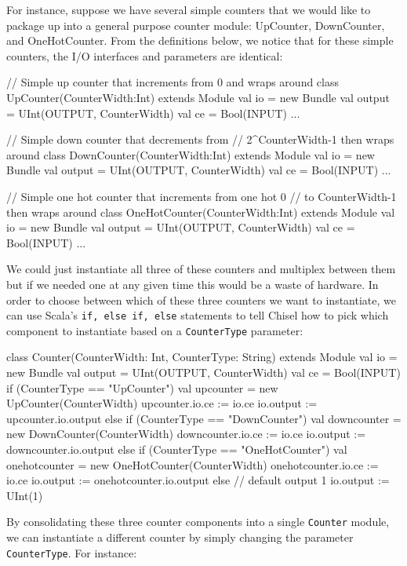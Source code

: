 For instance, suppose we have several simple counters that we would like to package up into a general purpose counter module: UpCounter, DownCounter, and OneHotCounter. From the definitions below, we notice that for these simple counters, the I/O interfaces and parameters are identical:

\begin{scala}
// Simple up counter that increments from 0 and wraps around
class UpCounter(CounterWidth:Int) extends Module {
  val io = new Bundle {
    val output = UInt(OUTPUT, CounterWidth)
    val ce     = Bool(INPUT)
  }...
}

// Simple down counter that decrements from 
// 2^CounterWidth-1 then wraps around
class DownCounter(CounterWidth:Int) extends Module{
  val io = new Bundle {
    val output = UInt(OUTPUT, CounterWidth)
    val ce     = Bool(INPUT)
  }...
}

// Simple one hot counter that increments from one hot 0 
// to CounterWidth-1 then wraps around
class OneHotCounter(CounterWidth:Int) extends Module {
  val io = new Bundle {
      val output = UInt(OUTPUT, CounterWidth)
      val ce     = Bool(INPUT)
  }...
}
\end{scala}

We could just instantiate all three of these counters and multiplex between them but if we needed one at any given time this would be a waste of hardware. In order to choose between which of these three counters we want to instantiate, we can use Scala's \verb+if, else if, else+ statements to tell Chisel how to pick which component to instantiate based on a \verb+CounterType+ parameter:

\begin{scala}
class Counter(CounterWidth: Int, CounterType: String) 
    extends Module {
  val io = new Bundle {
    val output = UInt(OUTPUT, CounterWidth)
    val ce     = Bool(INPUT)
  }
  if (CounterType == "UpCounter") {
     val upcounter = new UpCounter(CounterWidth)
     upcounter.io.ce := io.ce
     io.output := upcounter.io.output
  } else if (CounterType == "DownCounter") {
    val downcounter = new DownCounter(CounterWidth)
    downcounter.io.ce := io.ce
    io.output := downcounter.io.output
  } else if (CounterType == "OneHotCounter") {
    val onehotcounter = new OneHotCounter(CounterWidth)
    onehotcounter.io.ce := io.ce
    io.output := onehotcounter.io.output
  } else {
    // default output 1
    io.output := UInt(1)
  }
}
\end{scala}

By consolidating these three counter components into a single \verb+Counter+ module, we can instantiate a different counter by simply changing the parameter \verb+CounterType+. For instance:

